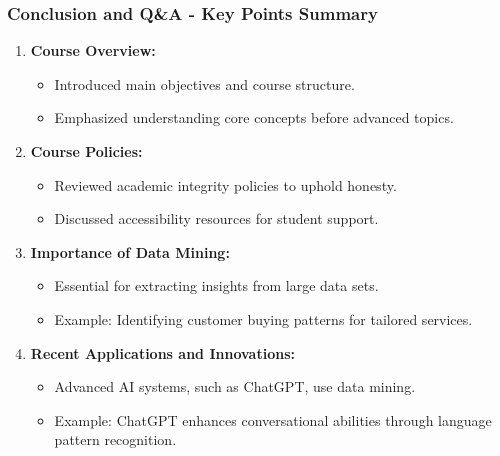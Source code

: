 \documentclass[aspectratio=169]{beamer}
\begin{document}
\begin{frame}[fragile]
    \frametitle{Conclusion and Q\&A - Key Points Summary}
    \begin{enumerate}
        \item \textbf{Course Overview:}
        \begin{itemize}
            \item Introduced main objectives and course structure.
            \item Emphasized understanding core concepts before advanced topics.
        \end{itemize}

        \item \textbf{Course Policies:}
        \begin{itemize}
            \item Reviewed academic integrity policies to uphold honesty.
            \item Discussed accessibility resources for student support.
        \end{itemize}

        \item \textbf{Importance of Data Mining:}
        \begin{itemize}
            \item Essential for extracting insights from large data sets.
            \item Example: Identifying customer buying patterns for tailored services.
        \end{itemize}

        \item \textbf{Recent Applications and Innovations:}
        \begin{itemize}
            \item Advanced AI systems, such as ChatGPT, use data mining.
            \item Example: ChatGPT enhances conversational abilities through language pattern recognition.
        \end{itemize}
    \end{enumerate}
\end{frame}
\end{document}
